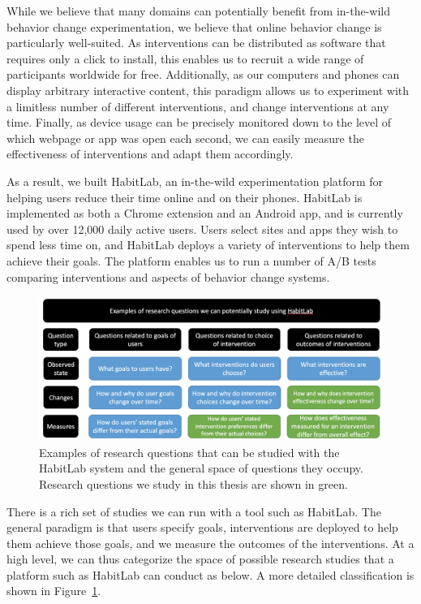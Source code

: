 While we believe that many domains can potentially benefit from in-the-wild behavior change experimentation, we believe that online behavior change is particularly well-suited. As interventions can be distributed as software that requires only a click to install, this enables us to recruit a wide range of participants worldwide for free. Additionally, as our computers and phones can display arbitrary interactive content, this paradigm allows us to experiment with a limitless number of different interventions, and change interventions at any time. Finally, as device usage can be precisely monitored down to the level of which webpage or app was open each second, we can easily measure the effectiveness of interventions and adapt them accordingly.

As a result, we built HabitLab, an in-the-wild experimentation platform for helping users reduce their time online and on their phones. HabitLab is implemented as both a Chrome extension and an Android app, and is currently used by over 12,000 daily active users. Users select sites and apps they wish to spend less time on, and HabitLab deploys a variety of interventions to help them achieve their goals. The platform enables us to run a number of A/B tests comparing interventions and aspects of behavior change systems.


\begin{figure}
  \includegraphics[width=\linewidth]{figuresI/researchquestions.png}
  \caption{Examples of research questions that can be studied with the HabitLab system and the general space of questions they occupy. Research questions we study in this thesis are shown in green.}
  \label{fig:researchquestions}
\end{figure}


There is a rich set of studies we can run with a tool such as HabitLab. The general paradigm is that users specify goals, interventions are deployed to help them achieve those goals, and we measure the outcomes of the interventions. At a high level, we can thus categorize the space of possible research studies that a platform such as HabitLab can conduct as below. A more detailed classification is shown in Figure~\ref{fig:researchquestions}.

